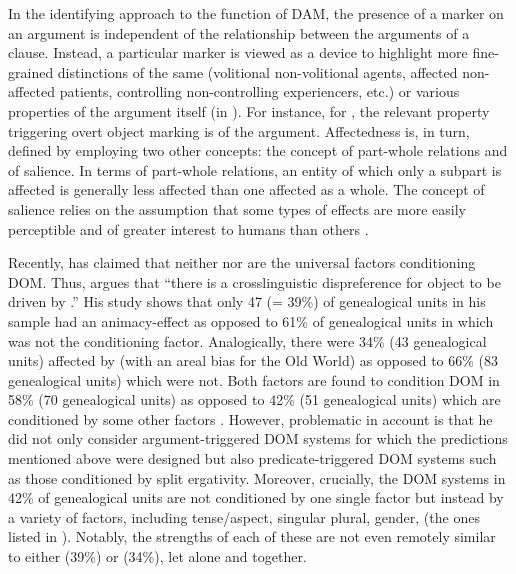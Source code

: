 \documentclass[output=paper]{LSP/langsci}
\begin{document}
In the identifying approach to the function of DAM, the presence of a marker on an argument is independent of the relationship between the arguments of a clause. 
Instead, a particular marker is viewed as a device to highlight more fine-grained distinctions of the same  (volitional \vs non-volitional agents, affected \vs non-affected patients, controlling \vs non-controlling experiencers, etc.) or various properties of the argument itself (\eg in \citealt{Hopperetal1980Transitivity, Dalrympleetal2011Objects}). 
For instance, for \citealt[1206]{Naess2004What}, the relevant property triggering overt object marking is  of the argument. 
Affectedness is, in turn, defined by employing two other concepts: the concept of part-whole relations and of salience. 
In terms of part-whole relations, an entity of which only a subpart is affected is generally less affected than one affected as a whole. 
The concept of salience relies on the assumption that some types of effects are more easily perceptible and of greater interest to humans than others \citep[1202]{Naess2004What}.

Recently, \citet{Sinnemki2014Typological} has claimed that neither  nor  are the universal factors conditioning DOM. 
Thus, \citet[295]{Sinnemki2014Typological} argues that “there is a crosslinguistic dispreference for object  to be driven by .” 
His study shows that only 47 (= 39\%) of genealogical units in his sample had an animacy-effect as opposed to 61\% of genealogical units in which  was not the conditioning factor. 
Analogically, there were 34\% (43 genealogical units) affected by  (with an areal bias for the Old World) as opposed to 66\% (83 genealogical units) which were not. 
Both factors are found to condition DOM in 58\% (70 genealogical units) as opposed to 42\% (51 genealogical units) which are conditioned by some other factors \citep[296]{Sinnemki2014Typological}. 
However, problematic in  account is that he did not only consider argument-triggered DOM systems for which the predictions mentioned above were designed but also predicate-triggered DOM systems such as those conditioned by split ergativity. 
Moreover, crucially, the DOM systems in 42\% of genealogical units are not conditioned by one single factor but instead by a variety of factors, including tense/aspect, singular \vs plural, gender, \etc (\cf the ones listed in \citealt[284--285]{Sinnemki2014Typological}). 
Notably, the strengths of each of these are not even remotely similar to either  (39\%) or  (34\%), let alone  and  together.
\end{document}
